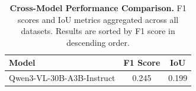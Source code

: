
\begin{table}[H]
\centering
\small
\setlength{\tabcolsep}{8pt}
\begin{tabular}{l c c}
\toprule
\textbf{Model} & \textbf{F1 Score} & \textbf{IoU} \\
\midrule
Qwen3-VL-30B-A3B-Instruct & 0.245 & 0.199 \\
\bottomrule
\end{tabular}
\caption{\textbf{Cross-Model Performance Comparison.} F1 scores and IoU metrics aggregated across all datasets. Results are sorted by F1 score in descending order.}
\label{tab:main_performance}
\end{table}